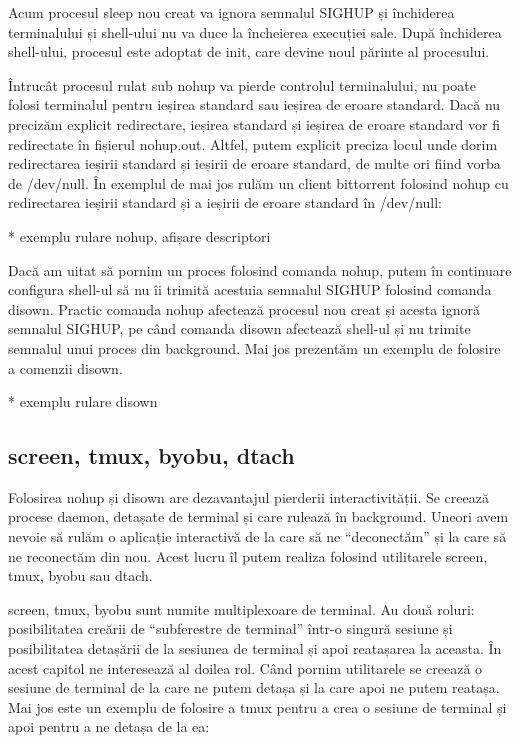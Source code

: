 Acum procesul sleep nou creat va ignora semnalul SIGHUP și închiderea
terminalului și shell-ului nu va duce la încheierea execuției sale. După
închiderea shell-ului, procesul este adoptat de init, care devine noul părinte
al procesului.

Întrucât procesul rulat sub nohup va pierde controlul terminalului, nu poate
folosi terminalul pentru ieșirea standard sau ieșirea de eroare standard. Dacă
nu precizăm explicit redirectare, ieșirea standard și ieșirea de eroare standard
vor fi redirectate în fișierul nohup.out. Altfel, putem explicit preciza locul
unde dorim redirectarea ieșirii standard și ieșirii de eroare standard, de multe
ori fiind vorba de /dev/null. În exemplul de mai jos rulăm un client bittorrent
folosind nohup cu redirectarea ieșirii standard și a ieșirii de eroare standard
în /dev/null:

* exemplu rulare nohup, afișare descriptori

Dacă am uitat să pornim un proces folosind comanda nohup, putem în continuare
configura shell-ul să nu îi trimită acestuia semnalul SIGHUP folosind comanda
disown. Practic comanda nohup afectează procesul nou creat și acesta ignoră
semnalul SIGHUP, pe când comanda disown afectează shell-ul și nu trimite
semnalul unui proces din background. Mai jos prezentăm un exemplu de folosire a
comenzii disown.

* exemplu rulare disown

\subsection{screen, tmux, byobu, dtach}

Folosirea nohup și disown are dezavantajul pierderii interactivității. Se
creează procese daemon, detașate de terminal și care rulează în background.
Uneori avem nevoie să rulăm o aplicație interactivă de la care să ne
“deconectăm” și la care să ne reconectăm din nou. Acest lucru îl putem realiza
folosind utilitarele screen, tmux, byobu sau dtach.

screen, tmux, byobu sunt numite multiplexoare de terminal. Au două roluri:
posibilitatea creării de “subferestre de terminal” într-o singură sesiune și
posibilitatea detașării de la sesiunea de terminal și apoi reatașarea la
aceasta. În acest capitol ne interesează al doilea rol. Când pornim utilitarele
se creează o sesiune de terminal de la care ne putem detașa și la care apoi ne
putem reatașa. Mai jos este un exemplu de folosire a tmux pentru a crea o
sesiune de terminal și apoi pentru a ne detașa de la ea:

